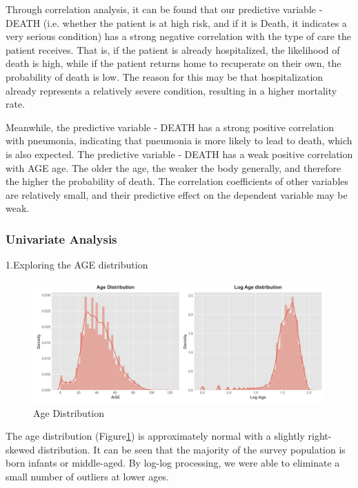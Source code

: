 \documentclass[
  journal=medium,
  manuscript=Report,
  year=2023,
  volume=37,
]{cup-journal}
\begin{document}
Through correlation analysis, it can be found that our predictive variable - DEATH (i.e. whether the patient is at high risk, and if it is Death, it indicates a very serious condition) has a strong negative correlation with the type of care the patient receives. That is, if the patient is already hospitalized, the likelihood of death is high, while if the patient returns home to recuperate on their own, the probability of death is low. The reason for this may be that hospitalization already represents a relatively severe condition, resulting in a higher mortality rate.

Meanwhile, the predictive variable - DEATH has a strong positive correlation with pneumonia, indicating that pneumonia is more likely to lead to death, which is also expected. The predictive variable - DEATH has a weak positive correlation with AGE age. The older the age, the weaker the body generally, and therefore the higher the probability of death. The correlation coefficients of other variables are relatively small, and their predictive effect on the dependent variable may be weak.

\subsubsection{Univariate Analysis}

1.Exploring the AGE distribution

\begin{figure}[!hbtp]
    \centering
    \includegraphics[width=0.9\linewidth]{pic/Age Distribution.png}
    \caption{Age Distribution}
    \label{Age Distribution}
\end{figure}

The age distribution (Figure\ref{Age Distribution}) is approximately normal with a slightly right-skewed distribution. It can be seen that the majority of the survey population is born infants or middle-aged. By log-log processing, we were able to eliminate a small number of outliers at lower ages.
\end{document}
